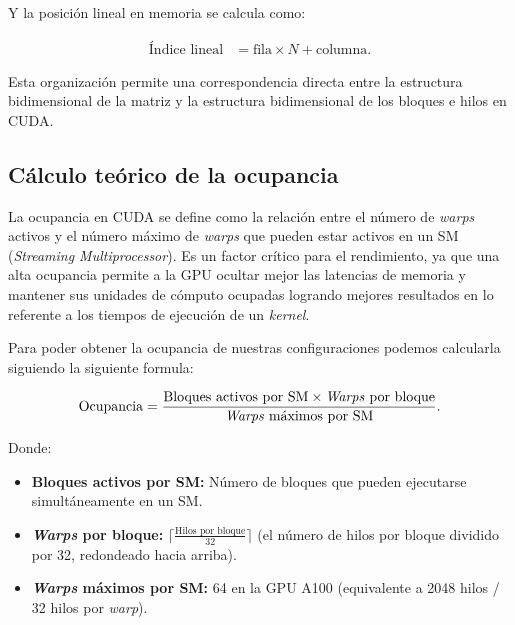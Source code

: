            Y la posición lineal en memoria se calcula como:
            
            \begin{align*}
                \text{Índice lineal} &= \text{fila} \times N + \text{columna}.
            \end{align*}
            
            Esta organización permite una correspondencia directa entre la estructura bidimensional de la matriz y la estructura bidimensional de los bloques e hilos en CUDA.
                
    \subsection{Cálculo teórico de la ocupancia}
    
        La ocupancia en CUDA se define como la relación entre el número de \textit{warps} activos y el número máximo de \textit{warps} que pueden estar activos en un SM (\textit{Streaming Multiprocessor}). Es un factor crítico para el rendimiento, ya que una alta ocupancia permite a la GPU ocultar mejor las latencias de memoria y mantener sus unidades de cómputo ocupadas logrando mejores resultados en lo referente a los tiempos de ejecución de un \textit{kernel}.
        
        Para poder obtener la ocupancia de nuestras configuraciones podemos calcularla siguiendo la siguiente formula:
        
        \begin{align*}
            \text{Ocupancia} = \frac{\text{Bloques activos por SM} \times \text{\textit{Warps} por bloque}}{\text{\textit{Warps} máximos por SM}}.
        \end{align*}
        
        Donde:
        
        \begin{itemize}
        
            \item \textbf{Bloques activos por SM:} Número de bloques que pueden ejecutarse simultáneamente en un SM.
           
            \item \textbf{\textit{Warps} por bloque:} $\lceil \frac{\text{Hilos por bloque}}{32} \rceil$ (el número de hilos por bloque dividido por 32, redondeado hacia arriba).
           
            \item \textbf{\textit{Warps} máximos por SM:} 64 en la GPU A100 (equivalente a 2048 hilos / 32 hilos por \textit{warp}).
        
        \end{itemize}
        
